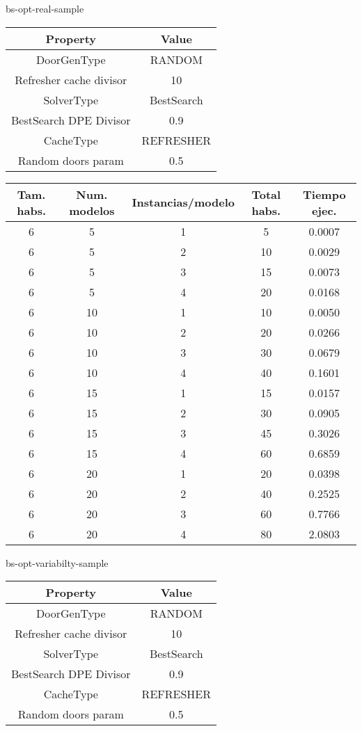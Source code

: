 bs-opt-real-sample
\begin{center}
	\begin{tabular}{ | c | c | }
\hline
 		Property & Value \\ \hline
DoorGenType & RANDOM \\ 
Refresher cache divisor & 10 \\ 
SolverType & BestSearch \\ 
BestSearch DPE Divisor & 0.9 \\ 
CacheType & REFRESHER \\ 
Random doors param & 0.5 \\ 
\hline
	\end{tabular}
\end{center}

\begin{center}
	\begin{tabular}{ | c | c | c | c | c | }
\hline
Tam. habs. & Num. modelos & Instancias/modelo & Total habs. & Tiempo ejec. \\ \hline 
6 & 5 & 1 & 5 & 0.0007 \\ 
6 & 5 & 2 & 10 & 0.0029 \\ 
6 & 5 & 3 & 15 & 0.0073 \\ 
6 & 5 & 4 & 20 & 0.0168 \\ 
6 & 10 & 1 & 10 & 0.0050 \\ 
6 & 10 & 2 & 20 & 0.0266 \\ 
6 & 10 & 3 & 30 & 0.0679 \\ 
6 & 10 & 4 & 40 & 0.1601 \\ 
6 & 15 & 1 & 15 & 0.0157 \\ 
6 & 15 & 2 & 30 & 0.0905 \\ 
6 & 15 & 3 & 45 & 0.3026 \\ 
6 & 15 & 4 & 60 & 0.6859 \\ 
6 & 20 & 1 & 20 & 0.0398 \\ 
6 & 20 & 2 & 40 & 0.2525 \\ 
6 & 20 & 3 & 60 & 0.7766 \\ 
6 & 20 & 4 & 80 & 2.0803 \\ 
\hline
	\end{tabular}
\end{center}

bs-opt-variabilty-sample
\begin{center}
	\begin{tabular}{ | c | c | }
\hline
 		Property & Value \\ \hline
DoorGenType & RANDOM \\ 
Refresher cache divisor & 10 \\ 
SolverType & BestSearch \\ 
BestSearch DPE Divisor & 0.9 \\ 
CacheType & REFRESHER \\ 
Random doors param & 0.5 \\ 
\hline
	\end{tabular}
\end{center}

